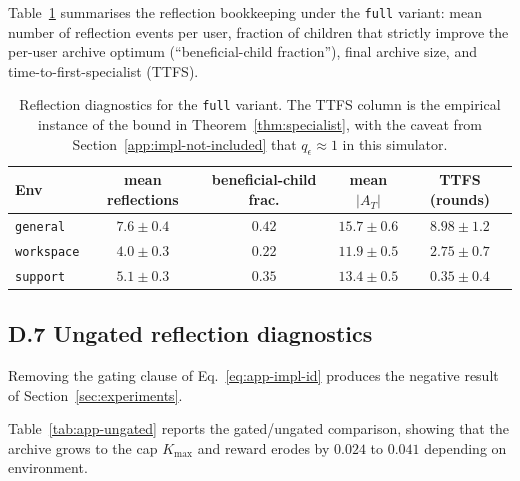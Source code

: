\documentclass{article} %
\begin{document}
\label{app:tab-refl}

Table~\ref{tab:app-reflection} summarises the reflection bookkeeping under the \texttt{full} variant: mean number of reflection events per user, fraction of children that strictly improve the per-user archive optimum (``beneficial-child fraction''), final archive size, and time-to-first-specialist (TTFS).

\begin{table}[h]
\centering
\small
\begin{tabular}{lcccc}
\toprule
Env & mean reflections & beneficial-child frac. & mean $|A_T|$ & TTFS (rounds) \\
\midrule
\texttt{general}   & $7.6 \pm 0.4$ & $0.42$ & $15.7 \pm 0.6$ & $8.98 \pm 1.2$ \\
\texttt{workspace} & $4.0 \pm 0.3$ & $0.22$ & $11.9 \pm 0.5$ & $2.75 \pm 0.7$ \\
\texttt{support}   & $5.1 \pm 0.3$ & $0.35$ & $13.4 \pm 0.5$ & $0.35 \pm 0.4$ \\
\bottomrule
\end{tabular}
\caption{Reflection diagnostics for the \texttt{full} variant. The TTFS column is the empirical instance of the bound in Theorem~\ref{thm:specialist}, with the caveat from Section~\ref{app:impl-not-included} that $q_\epsilon \approx 1$ in this simulator.}
\label{tab:app-reflection}
\end{table}

\subsection{D.7 Ungated reflection diagnostics}

\label{app:tab-ungated}

Removing the gating clause of Eq.~\eqref{eq:app-impl-id} produces the negative result of Section~\ref{sec:experiments}.

Table~\ref{tab:app-ungated} reports the gated/ungated comparison, showing that the archive grows to the cap $K_{\max}$ and reward erodes by $0.024$ to $0.041$ depending on environment.
\end{document}
